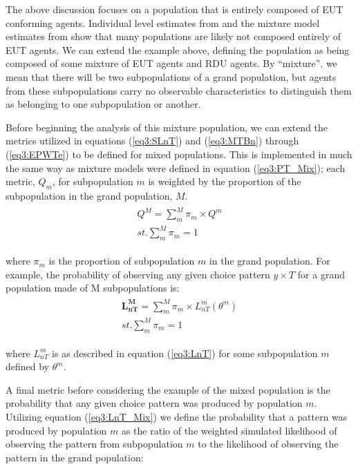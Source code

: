 \documentclass[../main.tex]{subfiles}
\begin{document}
The above discussion focuses on a population that is entirely composed of EUT conforming agents.
Individual level estimates from \textcite{Hey1994} and the mixture model estimates from \textcite{Harrison2008a} show that many populations are likely not composed entirely of EUT agents.
We can extend the example above, defining the population as being composed of some mixture of EUT agents and RDU agents.
By \enquote{mixture}, we mean that there will be two subpopulations of a grand population, but agents from these subpopulations carry no observable characteristics to distinguish them as belonging to one subpopulation or another.

Before beginning the analysis of this mixture population, we can extend the metrics utilized in equations (\ref{eq3:SLnT}) and (\ref{eq3:MTBn}) through (\ref{eq3:EPWTe}) to be defined for mixed populations.
This is implemented in much the same way as mixture models were defined in equation (\ref{eq3:PT_Mix}); each metric, $Q_m$, for subpopulation $m$ is weighted by the proportion of the subpopulation in the grand population, $M$.
\begin{align}
	\label{eq3:Metric_Mix}
	\begin{split}
		\bm{\mathit{Q^M}} = \sum_m^M \pi_m \times Q^m \\ 
		\mathit{st.} \sum_m^M \pi_m = 1
	\end{split}
\end{align}

\noindent where $\pi_m$ is the proportion of subpopulation $m$ in the grand population.
For example, the probability of observing any given choice pattern $y \times T$ for a grand population made of M subpopulations is:
\begin{align}
	\label{eq3:LnT_Mix}
	\begin{split}
		\bm{L_{nT}^M} = \sum_m^M \pi_m \times L_{nT}^m(\theta^m) \\ 
		\mathit{st.} \sum_m^M \pi_m = 1
	\end{split}
\end{align}

\noindent where $L_{nT}^m$ is as described in equation (\ref{eq3:LnT}) for some subpopulation $m$ defined by $\theta^m$.

A final metric before considering the example of the mixed population is the probability that any given choice pattern was produced by population $m$.
Utilizing equation (\ref{eq3:LnT_Mix}) we define the probability that a pattern was produced by population $m$ as the ratio of the weighted simulated likelihood of observing the pattern from subpopulation $m$ to the likelihood of observing the pattern in the grand population:
\end{document}
